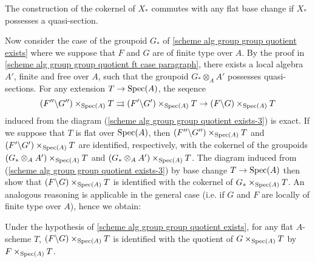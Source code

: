 \begin{proposition}\label{scheme groupoid quotient commutes with base change if locally quasi-section}
The construction of the cokernel of $X_*$ commutes with any flat base change if $X_*$ possesses a quasi-section.
\end{proposition}

Now consider the case of the groupoid $G_*$ of \cref{scheme alg group group quotient exists} where we suppose that $F$ and $G$ are of finite type over $A$. By the proof in \ref{scheme alg group group quotient ft case paragraph}, there exists a local algebra $A'$, finite and free over $A$, such that the groupoid $G_*\otimes_AA'$ possesses quasi-sections. For any extension $T\to\mathrm{Spec}(A)$, the seqence
\[(F''\backslash G'')\times_{\mathrm{Spec}(A)}T\rightrightarrows (F'\backslash G')\times_{\mathrm{Spec}(A)}T\to(F\backslash G)\times_{\mathrm{Spec}(A)}T\]
induced from the diagram (\ref{scheme alg group group quotient exists-3}) is exact. If we suppose that $T$ is flat over $\mathrm{Spec}(A)$, then $(F''\backslash G'')\times_{\mathrm{Spec}(A)}T$ and $(F'\backslash G')\times_{\mathrm{Spec}(A)}T$ are identified, respectively, with the cokernel of the groupoids $(G_*\otimes_AA')\times_{\mathrm{Spec}(A)}T$ and $(G_*\otimes_AA')\times_{\mathrm{Spec}(A)}T$. The diagram induced from (\ref{scheme alg group group quotient exists-3}) by base change $T\to\mathrm{Spec}(A)$ then show that $(F\backslash G)\times_{\mathrm{Spec}(A)}T$ is identified with the cokernel of $G_*\times_{\mathrm{Spec}(A)}T$. An analogous reasoning is applicable in the general case (i.e. if $G$ and $F$ are locally of finite type over $A$), hence we obtain:

\begin{proposition}\label{scheme alg group group quotient and base change}
Under the hypothesis of \cref{scheme alg group group quotient exists}, for any flat $A$-scheme $T$, $(F\backslash G)\times_{\mathrm{Spec}(A)}T$ is identified with the quotient of $G\times_{\mathrm{Spec}(A)}T$ by $F\times_{\mathrm{Spec}(A)}T$.
\end{proposition}

